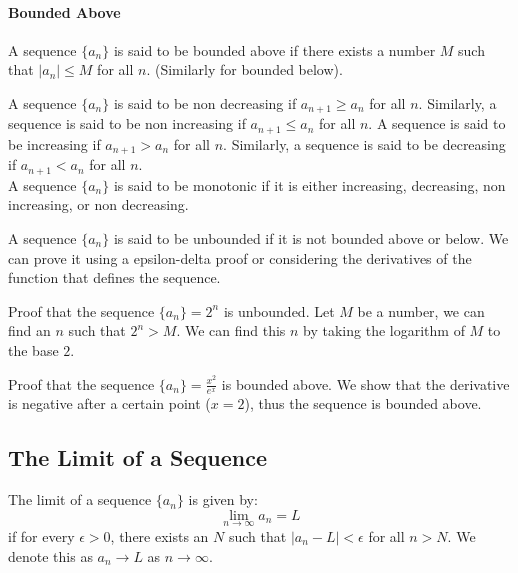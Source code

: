 \documentclass[11pt]{article}
\begin{document}
\paragraph{Bounded Above} A sequence $\{a_n\}$ is said to be bounded above if there exists a number $M$ such that $|a_n| \le M$ for all $n$. (Similarly for bounded below).
\begin{definition}
    A sequence $\{a_n\}$ is said to be non decreasing if $a_{n+1} \ge a_n$ for all $n$. Similarly, a sequence is said to be non increasing if $a_{n+1} \le a_n$ for all $n$. A sequence is said to be increasing if $a_{n+1} > a_n$ for all $n$. Similarly, a sequence is said to be decreasing if $a_{n+1} < a_n$ for all $n$.
\\ A sequence $\{a_n\}$ is said to be monotonic if it is either increasing, decreasing, non increasing, or non decreasing.
\end{definition}
\begin{definition}
    A sequence $\{a_n\}$ is said to be unbounded if it is not bounded above or below. We can prove it using a epsilon-delta proof or considering the derivatives of the function that defines the sequence.
\end{definition}
\begin{example}
    Proof that the sequence $\{a_n\} = 2^n$ is unbounded. Let $M$ be a number, we can find an $n$ such that $2^n > M$. We can find this $n$ by taking the logarithm of $M$ to the base $2$.
\end{example}
\begin{example}
    Proof that the sequence $\{a_n\} = \frac{x^2}{e^x}$ is bounded above. We show that the derivative is negative after a certain point ($x = 2$), thus the sequence is bounded above.
\end{example}
\subsection{The Limit of a Sequence}
\begin{definition}
    The limit of a sequence $\{a_n\}$ is given by:
    \begin{equation*}
        \lim_{n \to \infty} a_n = L
    \end{equation*}
    if for every $\epsilon > 0$, there exists an $N$ such that $|a_n - L| < \epsilon$ for all $n > N$. We denote this as $a_n \to L$ as $n \to \infty$.
\end{definition}
\end{document}
